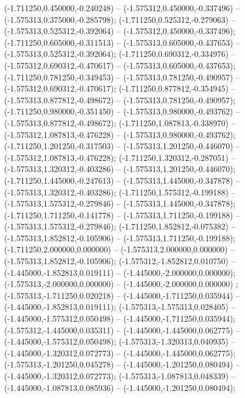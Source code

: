  (-1.711250,0.450000,-0.240248) -- (-1.575312,0.450000,-0.337496) -- (-1.575313,0.375000,-0.285798);
 (-1.711250,0.525312,-0.279063) -- (-1.575313,0.525312,-0.392064) -- (-1.575312,0.450000,-0.337496);
 (-1.711250,0.605000,-0.311513) -- (-1.575313,0.605000,-0.437653) -- (-1.575313,0.525312,-0.392064);
 (-1.711250,0.690312,-0.334976) -- (-1.575312,0.690312,-0.470617) -- (-1.575313,0.605000,-0.437653);
 (-1.711250,0.781250,-0.349453) -- (-1.575313,0.781250,-0.490957) -- (-1.575312,0.690312,-0.470617);
 (-1.711250,0.877812,-0.354945) -- (-1.575313,0.877812,-0.498672) -- (-1.575313,0.781250,-0.490957);
 (-1.711250,0.980000,-0.351450) -- (-1.575313,0.980000,-0.493762) -- (-1.575313,0.877812,-0.498672);
 (-1.711250,1.087813,-0.338970) -- (-1.575312,1.087813,-0.476228) -- (-1.575313,0.980000,-0.493762);
 (-1.711250,1.201250,-0.317503) -- (-1.575313,1.201250,-0.446070) -- (-1.575312,1.087813,-0.476228);
 (-1.711250,1.320312,-0.287051) -- (-1.575313,1.320312,-0.403286) -- (-1.575313,1.201250,-0.446070);
 (-1.711250,1.445000,-0.247613) -- (-1.575313,1.445000,-0.347878) -- (-1.575313,1.320312,-0.403286);
 (-1.711250,1.575312,-0.199188) -- (-1.575313,1.575312,-0.279846) -- (-1.575313,1.445000,-0.347878);
 (-1.711250,1.711250,-0.141778) -- (-1.575313,1.711250,-0.199188) -- (-1.575313,1.575312,-0.279846);
 (-1.711250,1.852812,-0.075382) -- (-1.575313,1.852812,-0.105906) -- (-1.575313,1.711250,-0.199188);
 (-1.711250,2.000000,0.000000) -- (-1.575313,2.000000,0.000000) -- (-1.575313,1.852812,-0.105906);
 (-1.575312,-1.852812,0.010750) -- (-1.445000,-1.852813,0.019111) -- (-1.445000,-2.000000,0.000000);
 (-1.575313,-2.000000,0.000000) -- (-1.445000,-2.000000,0.000000) ;
 (-1.575313,-1.711250,0.020218) -- (-1.445000,-1.711250,0.035944) -- (-1.445000,-1.852813,0.019111);
 (-1.575313,-1.575313,0.028405) -- (-1.445000,-1.575312,0.050498) -- (-1.445000,-1.711250,0.035944);
 (-1.575312,-1.445000,0.035311) -- (-1.445000,-1.445000,0.062775) -- (-1.445000,-1.575312,0.050498);
 (-1.575313,-1.320313,0.040935) -- (-1.445000,-1.320312,0.072773) -- (-1.445000,-1.445000,0.062775);
 (-1.575313,-1.201250,0.045278) -- (-1.445000,-1.201250,0.080494) -- (-1.445000,-1.320312,0.072773);
 (-1.575313,-1.087813,0.048339) -- (-1.445000,-1.087813,0.085936) -- (-1.445000,-1.201250,0.080494);
